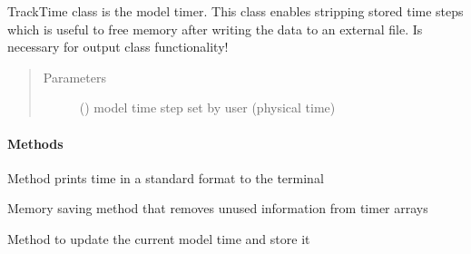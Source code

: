 \documentclass[letterpaper,10pt,english]{sphinxmanual}
\begin{document}

\begin{fulllineitems}
\label{\detokenize{index:lb_colloids.Colloids.LB_Colloid.TrackTime}}
TrackTime class is the model timer. This class enables stripping stored time steps which
is useful to free memory after writing the data to an external file. Is necessary for
output class functionality!
\begin{quote}\begin{description}
\item[{Parameters}] \leavevmode
{} () \textendash{} model time step set by user (physical time)

\end{description}\end{quote}
\paragraph{Methods}

\begin{fulllineitems}
\label{\detokenize{index:lb_colloids.Colloids.LB_Colloid.TrackTime.print_time}}
Method prints time in a standard format to the terminal

\end{fulllineitems}


\begin{fulllineitems}
\label{\detokenize{index:lb_colloids.Colloids.LB_Colloid.TrackTime.strip_time}}
Memory saving method that removes unused information from timer arrays

\end{fulllineitems}


\begin{fulllineitems}
\label{\detokenize{index:lb_colloids.Colloids.LB_Colloid.TrackTime.update_time}}
Method to update the current model time and store it

\end{fulllineitems}


\end{fulllineitems}
\end{document}
